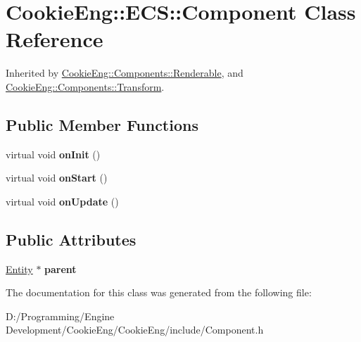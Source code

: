 \hypertarget{class_cookie_eng_1_1_e_c_s_1_1_component}{}\section{Cookie\+Eng\+:\+:E\+CS\+:\+:Component Class Reference}
\label{class_cookie_eng_1_1_e_c_s_1_1_component}


Inherited by \hyperlink{class_cookie_eng_1_1_components_1_1_renderable}{Cookie\+Eng\+::\+Components\+::\+Renderable}, and \hyperlink{class_cookie_eng_1_1_components_1_1_transform}{Cookie\+Eng\+::\+Components\+::\+Transform}.

\subsection*{Public Member Functions}
\begin{DoxyCompactItemize}
\item 
\mbox{\label{class_cookie_eng_1_1_e_c_s_1_1_component_a4b02b630558005a9c4723cf15b8b03d6}} 
virtual void {\bfseries on\+Init} ()
\item 
\mbox{\label{class_cookie_eng_1_1_e_c_s_1_1_component_aaf8523586d57c3e40d4149f228755139}} 
virtual void {\bfseries on\+Start} ()
\item 
\mbox{\label{class_cookie_eng_1_1_e_c_s_1_1_component_a7c4a11f71e21181bc6f56841565b9a56}} 
virtual void {\bfseries on\+Update} ()
\end{DoxyCompactItemize}
\subsection*{Public Attributes}
\begin{DoxyCompactItemize}
\item 
\mbox{\label{class_cookie_eng_1_1_e_c_s_1_1_component_a8a0c5a4ee3a87809d3e6d0bdaed3ebbe}} 
\hyperlink{class_cookie_eng_1_1_e_c_s_1_1_entity}{Entity} $\ast$ {\bfseries parent}
\end{DoxyCompactItemize}


The documentation for this class was generated from the following file\+:\begin{DoxyCompactItemize}
\item 
D\+:/\+Programming/\+Engine Development/\+Cookie\+Eng/\+Cookie\+Eng/include/Component.\+h\end{DoxyCompactItemize}

